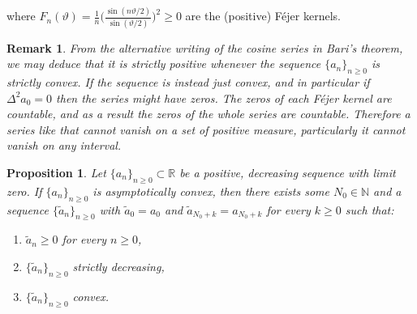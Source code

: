 \documentclass{amsart}[11pt]
\newcommand{\R}{\mathbb{R}} %
\newcommand{\N}{\mathbb{N}} %
\newcommand{\sbs}{\subset} %
\newcommand{\vth}{\vartheta}
\newtheorem{remark}[theorem]{Remark}
\newtheorem{proposition}[theorem]{Proposition}
\theoremstyle{definition}
\begin{document}
where $F_n(\vth) = \frac{1}{n} \bigg( \frac{\sin(n\vth/ 2)}{\sin(\vth /2)}\bigg)^2 \geq 0$ are the (positive) Féjer kernels.

\begin{remark}
    From the alternative writing of the cosine series in Bari's theorem, we may deduce that it is strictly positive whenever the sequence $\{a_n\}_{n\geq 0}$ is strictly convex. If the sequence is instead just convex, and in particular if $\Delta^2 a_0 = 0$ then the series might have zeros. The zeros of each Féjer kernel are countable, and as a result the zeros of the whole series are countable. Therefore a series like that cannot vanish on a set of positive measure, particularly it cannot vanish on any interval.
\end{remark}


\begin{proposition}
     Let $\{a_n\}_{n \geq 0} \sbs \R$ be a positive, decreasing sequence with limit zero. If $\{a_n\}_{n \geq 0}$ is asymptotically convex, then there exists some $N_0 \in \N$ and a sequence $\{\tilde{a}_n\}_{n\geq 0}$ with $\tilde{a}_0 = a_0$ and $\tilde{a}_{N_0+k} = a_{N_0+k}$ for every $k \geq 0$ such that:

    \begin{enumerate}[label = (\arabic*)]
        \item $\tilde{a}_n \geq 0$ for every $n \geq 0$,
        \item $\{\tilde{a}_n\}_{n \geq 0}$ strictly decreasing,
        \item $ \{ \tilde{a}_n \}_{n \geq 0}$ convex.
    \end{enumerate}
\end{proposition}
\end{document}

